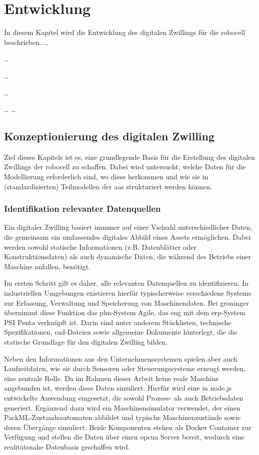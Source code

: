 \section{Entwicklung}
In diesem Kapitel wird die Entwicklung des digitalen Zwillings für die robocell beschrieben.
\dots

\dots

\dots

\dots

\dots
\dots
\subsection{Konzeptionierung des digitalen Zwilling}
Ziel dieses Kapitels ist es, eine grundlegende Basis für die Erstellung des digitalen Zwillings der robocell zu schaffen.
Dabei wird untersucht, welche Daten für die Modellierung erforderlich sind, wo diese herkommen und wie sie in (standardisierten) Teilmodellen der \acs{aas} strukturiert werden können.
\subsubsection{Identifikation relevanter Datenquellen}
Ein digitaler Zwilling basiert immmer auf einer Vielzahl unterschiedlicher Daten, die gemeinsam ein umfassendes digitales Abbild eines Assets ermöglichen. 
Dabei werden sowohl statische Informationen (z.B. Datenblätter oder Konstruktionsdaten) als auch dynamische Daten, die während des Betriebs einer Maschine anfallen, benötigt.

Im ersten Schritt gilt es daher, alle relevanten Datenquellen zu identifizieren.
In industriellen Umgebungen existieren hierfür typischerweise verschiedene Systeme zur Erfassung, Verwaltung und Speicherung von Maschinendaten.
Bei groninger übernimmt diese Funktion das \acs{plm}-System Agile, das eng mit dem \acs{erp}-System PSI Penta verknüpft ist.
Darin sind unter anderem Stücklisten, technische Spezifikationen, \acs{cad}-Dateien sowie allgemeine Dokumente hinterlegt, die die statische Grundlage  für den digitalen Zwilling bilden.

Neben den Informationen aus den Unternehmenssystemen spielen aber auch Laufzeitdaten, wie sie durch Sensoren oder Steuerungssysteme erzeugt werden, eine zentrale Rolle.
Da im Rahmen dieser Arbeit keine reale Maschine angebunden ist, werden diese Daten simuliert.
Hierfür wird eine in node.js entwickelte Anwendung eingesetzt, die sowohl Prozess- als auch Betriebsdaten generiert. 
Ergänzend dazu wird ein Maschinensimulator verwendet, der einen PackML-Zustandsautomaten abbildet und typische Maschinenzustände sowie deren Übergänge simuliert. 
Beide Komponenten stehen als Docker Container zur Verfügung und stellen die Daten über einen \acs{opcua} Server bereit, wodurch eine realitätsnahe Datenbasis geschaffen wird.

